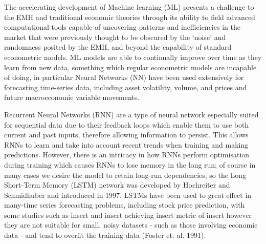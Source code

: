 \documentclass[12pt,a4paper]{article}
\begin{document}
The accelerating development of Machine learning (ML) presents a challenge to the EMH and traditional economic theories through its ability to field advanced computational tools capable of uncovering patterns and inefficiencies in the market that were previously thought to be obscured by the ‘noise’ and randomness posited by the EMH, and beyond the capability of standard econometric models. ML models are able to continually improve over time as they learn from new data, something which regular econometric models are incapable of doing, in particular Neural Networks (NN) have been used extensively for forecasting time-series data, including asset volatility, volume, and prices and future macroeconomic variable movements.

Recurrent Neural Networks (RNN) are a type of neural network especially suited for sequential data due to their feedback loops which enable them to use both current and past inputs, therefore allowing information to persist. This allows RNNs to learn and take into account recent trends when training and making predictions. However, there is an intricacy in how RNNs perform optimisation during training which causes RNNs to lose memory in the long run; of course in many cases we desire the model to retain long-run dependencies, so the Long Short-Term Memory (LSTM) network was developed by Hochreiter and Schmidhuber and introduced in 1997. LSTMs have been used to great effect in many-time series forecasting problems, including stock price prediction, with some studies such as insert and insert achieving insert metric of insert however they are not suitable for small, noisy datasets - such as those involving economic data - and tend to overfit the training data (Foster et. al. 1991).
\end{document}
